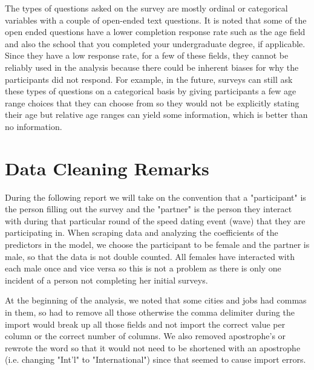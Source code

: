 \documentclass{article}
\begin{document}
The types of questions asked on the survey are mostly ordinal or categorical variables with a couple of open-ended text questions.  It is noted that some of the open ended questions have a lower completion response rate such as the age field and also the school that you completed your undergraduate degree, if applicable.  Since they have a low response rate, for a few of these fields, they cannot be reliably used in the analysis because there could be inherent biases for why the participants did not respond. For example, in the future, surveys can still ask these types of questions on a categorical basis by giving participants a few age range choices that they can choose from so they would not be explicitly stating their age but relative age ranges can yield some information, which is better than no information.\\


\section{Data Cleaning Remarks}
During the following report we will take on the convention that a "participant" is the person filling out the survey and the "partner" is the person they interact with during that particular round of the speed dating event (wave) that they are participating in.  When scraping data and analyzing the coefficients of the predictors in the model, we choose the participant to be female and the partner is male, so that the data is not double counted.  All females have interacted with each male once and vice versa so this is not a problem as there is only one incident of a person not completing her initial surveys.

At the beginning of the analysis, we noted that some cities and jobs had commas in them, so had to remove all those otherwise the comma delimiter during the import would break up all those fields and not import the correct value per column or the correct number of columns.  We also removed apostrophe's  or rewrote the word so that it would not need to be shortened with an apostrophe (i.e. changing "Int'l" to "International") since that seemed to cause import errors.\\

\end{document}
